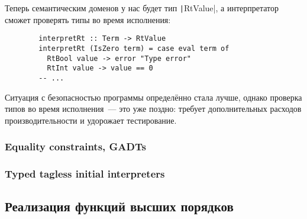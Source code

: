 \documentclass[12pt]{article}
\begin{document}
    Теперь семантическим доменов у нас будет тип \texttt|RtValue|, а интерпретатор сможет проверять типы во время исполнения:
    \begin{verbatim}
        interpretRt :: Term -> RtValue
        interpretRt (IsZero term) = case eval term of
          RtBool value -> error "Type error"
          RtInt value -> value == 0
        -- ...
    \end{verbatim}

    Ситуация с безопасностью программы определённо стала лучше, однако проверка типов во время исполнения~--- это уже поздно: требует дополнительных расходов производительности и удорожает тестирование.

    \subsubsection{Equality constraints, GADTs}




    \subsubsection{Typed tagless initial interpreters}



    \subsection{Реализация функций высших порядков}






    \cite{reynolds1998definitional}
    \cite{defunctionalization-slides}



\end{document}
